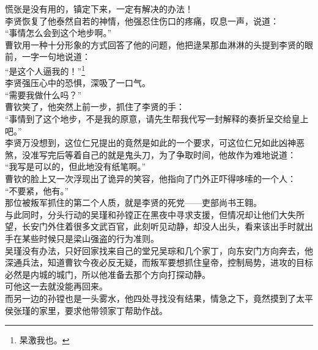 \begin{multicols}{\theparacolNo}
慌张是没有用的，镇定下来，一定有解决的办法！\\

李贤恢复了他泰然自若的神情，他强忍住伤口的疼痛，叹息一声，说道：\\

“事情怎么会到这个地步啊。”\\

曹钦用一种十分形象的方式回答了他的问题，他把逯杲那血淋淋的头提到李贤的眼前，一字一句地说道：\\

“是这个人逼我的！”\footnote{杲激我也。}\\

李贤强压心中的恐惧，深吸了一口气。\\

“需要我做什么吗？”\\

曹钦笑了，他突然上前一步，抓住了李贤的手：\\

“事情到了这个地步，不是我的原意，请先生帮我代写一封解释的奏折呈交给皇上吧。”\\

李贤万没想到，这位仁兄提出的竟然是如此的一个要求，可这位仁兄如此凶神恶煞，没准写完后等着自己的就是鬼头刀，为了争取时间，他故作为难地说道：\\

“我写是可以的，但此地没有纸笔啊。”\\

曹钦的脸上又一次浮现出了诡异的笑容，他指向了门外正吓得哆嗦的一个人：\\

“不要紧，他有。”\\

那位被叛军抓住的第二个人质，就是李贤的死党——吏部尚书王翱。\\

与此同时，分头行动的吴瑾和孙镗正在黑夜中寻求支援，但情况却让他们大失所望，长安门外住着很多文武百官，此刻听见动静，却没人出头，看来该出手时就出手在某些时候只是梁山强盗的行为准则。\\

吴瑾没有办法，只好回家找来自己的堂兄吴琮和几个家丁，向东安门方向奔去，他深通兵法，知道曹钦今夜必反无疑，而叛军要想抓住皇帝，控制局势，进攻的目标必然是内城的城门，所以他准备去那个方向打探动静。\\

可他这一去就没能再回来。\\

而另一边的孙镗也是一头雾水，他四处寻找没有结果，情急之下，竟然摸到了太平侯张瑾的家里，要求他带领家丁帮助作战。\\


\end{multicols}
